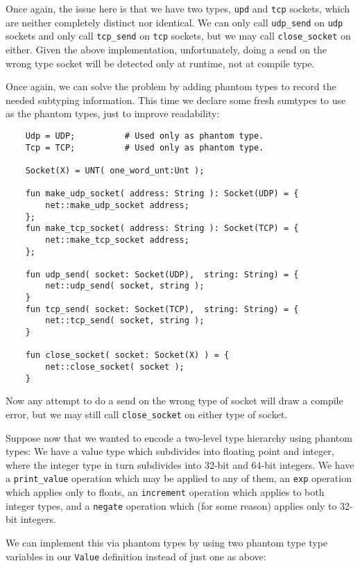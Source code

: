 Once again, the issue here is that we have two types, {\tt upd} and {\tt tcp} 
sockets, which are neither completely distinct nor identical.  We can only 
call {\tt udp\_send} on {\tt udp} sockets and only call {\tt tcp\_send} on 
{\tt tcp} sockets, but we may call {\tt close\_socket} on either.  Given the 
above implementation, unfortunately, doing a send on the wrong type socket 
will be detected only at runtime, not at compile type.

Once again, we can solve the problem by adding phantom types to record 
the needed subtyping information.  This time we declare some fresh 
sumtypes to use as the phantom types, just to improve readability:

\begin{verbatim}
    Udp = UDP;          # Used only as phantom type.
    Tcp = TCP;          # Used only as phantom type.

    Socket(X) = UNT( one_word_unt:Unt );

    fun make_udp_socket( address: String ): Socket(UDP) = {
        net::make_udp_socket address;
    };
    fun make_tcp_socket( address: String ): Socket(TCP) = {
        net::make_tcp_socket address;
    };

    fun udp_send( socket: Socket(UDP),  string: String) = {
        net::udp_send( socket, string );
    }
    fun tcp_send( socket: Socket(TCP),  string: String) = {
        net::tcp_send( socket, string );
    }

    fun close_socket( socket: Socket(X) ) = {
        net::close_socket( socket );
    }    
\end{verbatim}

Now any attempt to do a send on the wrong type of socket will 
draw a compile error, but we may still call {\tt close\_socket} on 
either type of socket.

Suppose now that we wanted to encode a two-level type hierarchy using 
phantom types:  We have a value type which subdivides into floating 
point and integer, where the integer type in turn subdivides into 
32-bit and 64-bit integers.  We have a {\tt print\_value} operation 
which may be applied to any of them, an {\tt exp} operation which 
applies only to floats, an {\tt increment} operation which applies 
to both integer types, and a {\tt negate} operation which (for 
some reason) applies only to 32-bit integers.

We can implement this via phantom types by using two phantom type 
type variables in our {\tt Value} definition instead of just one 
as above:

